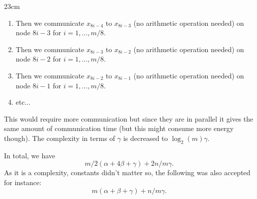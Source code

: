 \begin{parts}
\begin{solutionbox}{23cm}
\begin{itemize}
\begin{enumerate}
          \item Then we communicate $x_{8i-4}$ to $x_{8i-3}$ (no arithmetic operation needed) on node $8i-3$ for $i = 1, \ldots, m/8$.
          \item Then we communicate $x_{8i-3}$ to $x_{8i-2}$ (no arithmetic operation needed) on node $8i-2$ for $i = 1, \ldots, m/8$.
          \item Then we communicate $x_{8i-2}$ to $x_{8i-1}$ (no arithmetic operation needed) on node $8i-1$ for $i = 1, \ldots, m/8$.
          \item etc...
        \end{enumerate}
        This would require more communication but since they are in parallel it gives the same amount of communication time (but this might consume more energy though).
        The complexity in terms of $\gamma$ is decreased to $\log_2(m)\gamma$.
      \end{itemize}

      In total, we have
      \[ m/2 (\alpha + 4 \beta + \gamma) + 2n/m \gamma. \]
      As it is a complexity, constants didn't matter so, the following was also accepted for instance:
      \[ m (\alpha + \beta + \gamma) + n/m \gamma. \]
    \end{solutionbox}
\end{parts}
